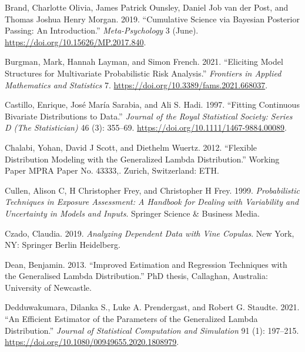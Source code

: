 \documentclass[
]{interact}
\newlength{\cslhangindent}
\newenvironment{CSLReferences}[2] %
 {\begin{list}{}{%
  \setlength{\itemindent}{0pt}
  \setlength{\leftmargin}{0pt}
  \setlength{\parsep}{0pt}
  \ifodd #1
   \setlength{\leftmargin}{\cslhangindent}
   \setlength{\itemindent}{-1\cslhangindent}
  \fi
  \setlength{\itemsep}{#2\baselineskip}}}
 {\end{list}}
\begin{document}
\begin{CSLReferences}{1}{0}
Brand, Charlotte Olivia, James Patrick Ounsley, Daniel Job van der Post,
and Thomas Joshua Henry Morgan. 2019. {``Cumulative {Science} via
{Bayesian Posterior Passing}: {An Introduction}.''}
\emph{Meta-Psychology} 3 (June).
\url{https://doi.org/10.15626/MP.2017.840}.

Burgman, Mark, Hannah Layman, and Simon French. 2021. {``Eliciting
{Model Structures} for {Multivariate Probabilistic Risk Analysis}.''}
\emph{Frontiers in Applied Mathematics and Statistics} 7.
\url{https://doi.org/10.3389/fams.2021.668037}.

Castillo, Enrique, José María Sarabia, and Ali S. Hadi. 1997. {``Fitting
Continuous Bivariate Distributions to Data.''} \emph{Journal of the
Royal Statistical Society: Series D (The Statistician)} 46 (3): 355--69.
\url{https://doi.org/10.1111/1467-9884.00089}.

Chalabi, Yohan, David J Scott, and Diethelm Wuertz. 2012. {``Flexible
Distribution Modeling with the Generalized Lambda Distribution.''}
Working Paper MPRA Paper No. 43333,. Zurich, Switzerland: ETH.

Cullen, Alison C, H Christopher Frey, and Christopher H Frey. 1999.
\emph{Probabilistic Techniques in Exposure Assessment: A Handbook for
Dealing with Variability and Uncertainty in Models and Inputs}. Springer
Science \& Business Media.

Czado, Claudia. 2019. \emph{Analyzing Dependent Data with Vine Copulas}.
New York, NY: Springer Berlin Heidelberg.

Dean, Benjamin. 2013. {``Improved Estimation and Regression Techniques
with the Generalised Lambda Distribution.''} PhD thesis, Callaghan,
Australia: University of Newcastle.

Dedduwakumara, Dilanka S., Luke A. Prendergast, and Robert G. Staudte.
2021. {``An Efficient Estimator of the Parameters of the Generalized
Lambda Distribution.''} \emph{Journal of Statistical Computation and
Simulation} 91 (1): 197--215.
\url{https://doi.org/10.1080/00949655.2020.1808979}.


\end{CSLReferences}
\end{document}

